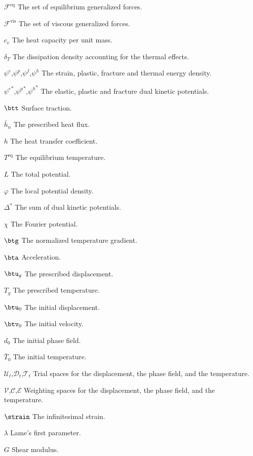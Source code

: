 \begin{symbollist}
  \item[$\mathcal{F}^\text{eq}$] The set of equilibrium generalized forces.
  \item[$\mathcal{F}^\text{vis}$] The set of viscous generalized forces.
  \item[$c_v$] The heat capacity per unit mass.
  \item[$\delta_T$] The dissipation density accounting for the thermal effects.
  \item[$\psi^e$,$\psi^p$,$\psi^f$,$\psi^h$] The strain, plastic, fracture and thermal energy density.
  \item[${\psi^e}^*$,${\psi^p}^*$,${\psi^h}^*$] The elastic, plastic and fracture dual kinetic potentials.
  \item[$\btt$] Surface traction.
  \item[$\bar{h}_n$] The prescribed heat flux.
  \item[$h$] The heat transfer coefficient.
  \item[$T^\text{eq}$] The equilibrium temperature.
  \item[$L$] The total potential.
  \item[$\varphi$] The local potential density.
  \item[$\Delta^*$] The sum of dual kinetic potentials.
  \item[$\chi$] The Fourier potential.
  \item[$\btg$] The normalized temperature gradient.
  \item[$\bta$] Acceleration.
  \item[$\btu_g$] The prescribed displacement.
  \item[$T_g$] The prescribed temperature.
  \item[$\btu_0$] The initial displacement.
  \item[$\btv_0$] The initial velocity.
  \item[$d_0$] The initial phase field.
  \item[$\bar{T}_0$] The initial temperature.
  \item[$\mathcal{U}_t$,$\mathcal{D}_t$,$\mathcal{T}_t$] Trial spaces for the displacement, the phase field, and the temperature.
  \item[$\mathcal{V}$,$\mathcal{C}$,$\mathcal{E}$] Weighting spaces for the displacement, the phase field, and the temperature.
  \item[$\strain$] The infinitesimal strain.
  \item[$\lambda$] Lame's first parameter.
  \item[$G$] Shear modulus.

\end{symbollist}
